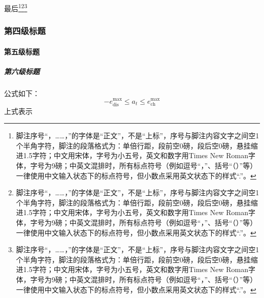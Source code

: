 



\zhlipsum[11]
最后\footnote{脚注序号“，……，”的字体是“正文”，不是“上标”，序号与脚注内容文字之间空1个半角字符，脚注的段落格式为：单倍行距，段前空0磅，段后空0磅，悬挂缩进1.5字符；中文用宋体，字号为小五号，英文和数字用Times New Roman字体，字号为9磅；中英文混排时，所有标点符号（例如逗号“，”、括号“（）”等）一律使用中文输入状态下的标点符号，但小数点采用英文状态下的样式“.”。}\footnote{脚注序号“，……，”的字体是“正文”，不是“上标”，序号与脚注内容文字之间空1个半角字符，脚注的段落格式为：单倍行距，段前空0磅，段后空0磅，悬挂缩进1.5字符；中文用宋体，字号为小五号，英文和数字用Times New Roman字体，字号为9磅；中英文混排时，所有标点符号（例如逗号“，”、括号“（）”等）一律使用中文输入状态下的标点符号，但小数点采用英文状态下的样式“.”。}\footnote{脚注序号“，……，”的字体是“正文”，不是“上标”，序号与脚注内容文字之间空1个半角字符，脚注的段落格式为：单倍行距，段前空0磅，段后空0磅，悬挂缩进1.5字符；中文用宋体，字号为小五号，英文和数字用Times New Roman字体，字号为9磅；中英文混排时，所有标点符号（例如逗号“，”、括号“（）”等）一律使用中文输入状态下的标点符号，但小数点采用英文状态下的样式“.”。}



\zhlipsum[12]



\subsubsection{第四级标题}

\paragraph{第五级标题}

\subparagraph{第六级标题}



公式如下：
\begin{equation}\label{eqn:c1:mdl:constraint_discharge}
    -e^{\max}_\text{dis} \leq a_t \leq e^{\max}_\text{ch}
\end{equation}
上式表示


